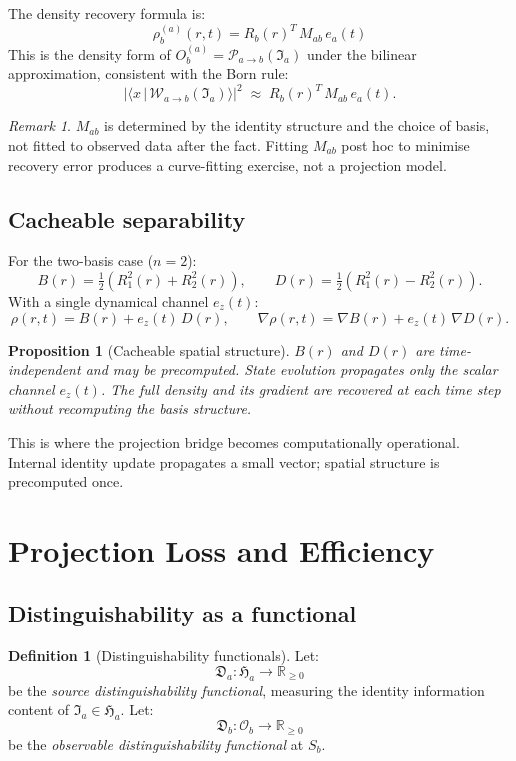 \documentclass[12pt, a4paper]{article}
\theoremstyle{definition}
\newtheorem{defn}{Definition}[section]
\theoremstyle{plain}
\newtheorem{prop}{Proposition}[section]
\theoremstyle{remark}
\newtheorem{remark}{Remark}[section]
\newcommand{\Ia}{\mathfrak{I}_a}
\newcommand{\Ha}{\mathfrak{H}_a}        %
\newcommand{\Osp}{\mathcal{O}_b}        %
\newcommand{\Sb}{S_b}
\newcommand{\Pab}{\mathcal{P}_{a\to b}}
\newcommand{\Wab}{\mathcal{W}_{a\to b}}   %
\newcommand{\Oba}{O_b^{(a)}}
\newcommand{\rhoab}{\rho_b^{(a)}}
\newcommand{\Dista}{\mathfrak{D}_a}
\newcommand{\Distb}{\mathfrak{D}_b}
\newcommand{\Rbvec}{R_b(r)}
\newcommand{\eavec}{e_a(t)}
\newcommand{\Mab}{M_{ab}}
\newcommand{\Bbase}{B(r)}
\newcommand{\Dmod}{D(r)}
\begin{document}
The density recovery formula is:
\[
  \boxed{\rhoab(r,t) = \Rbvec^T\,\Mab\,\eavec}
\]
This is the density form of $\Oba = \Pab(\Ia)$ under the bilinear
approximation, consistent with the Born rule:
\[
  |\langle x\,|\,\Wab(\Ia)\rangle|^2 \;\approx\; \Rbvec^T\,\Mab\,\eavec.
\]

\begin{remark}
$\Mab$ is determined by the identity structure and the choice of
basis, not fitted to observed data after the fact.
Fitting $\Mab$ post hoc to minimise recovery error produces a
curve-fitting exercise, not a projection model.
\end{remark}

\subsection{Cacheable separability}

For the two-basis case ($n = 2$):
\[
  \Bbase = \tfrac{1}{2}(R_1^2(r)+R_2^2(r)),
  \qquad
  \Dmod  = \tfrac{1}{2}(R_1^2(r)-R_2^2(r)).
\]
With a single dynamical channel $e_z(t)$:
\[
  \rho(r,t) = \Bbase + e_z(t)\,\Dmod,
  \qquad
  \nabla\rho(r,t) = \nabla\Bbase + e_z(t)\,\nabla\Dmod.
\]

\begin{prop}[Cacheable spatial structure]
\label{prop:cache}
$\Bbase$ and $\Dmod$ are time-independent and may be precomputed.
State evolution propagates only the scalar channel $e_z(t)$.
The full density and its gradient are recovered at each time step
without recomputing the basis structure.
\end{prop}

This is where the projection bridge becomes computationally operational.
Internal identity update propagates a small vector;
spatial structure is precomputed once.


\section{Projection Loss and Efficiency}
\label{sec:loss}

\subsection{Distinguishability as a functional}

\begin{defn}[Distinguishability functionals]
\label{def:dist}
Let:
\[
  \boxed{\Dista : \Ha \to \mathbb{R}_{\geq 0}}
\]
be the \emph{source distinguishability functional}, measuring the
identity information content of $\Ia \in \Ha$.
Let:
\[
  \boxed{\Distb : \Osp \to \mathbb{R}_{\geq 0}}
\]
be the \emph{observable distinguishability functional} at $\Sb$.
\end{defn}
\end{document}
